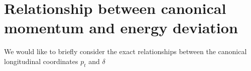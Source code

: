 \chapter{Relationship between canonical momentum and energy deviation} \label{pt}

We would like to briefly consider the exact relationships between the canonical longitudinal coordinates $p_t$ and $\delta$
